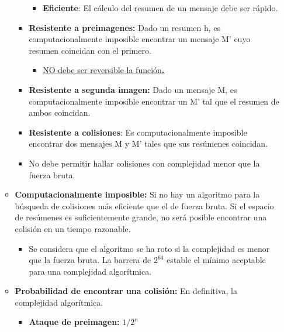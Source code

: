 \documentclass[12pt, twoside, openright]{report} %
\begin{document}
\begin{itemize}
\begin{itemize}
\begin{itemize}
\begin{itemize}
        \item \textbf{Eficiente}: El cálculo del resumen de un mensaje debe
          ser rápido.
          
        \end{itemize}
      \item \textbf{Resistente a preimagenes:} Dado un resumen h, es
        computacionalmente imposible encontrar un mensaje M' cuyo
        resumen coincidan con el primero.
        

        \begin{itemize}
        \item \underline{NO debe ser reversible la función\textbf{.}}
          
        \end{itemize}
      \item \textbf{Resistente a segunda imagen:} Dado un mensaje M, es
        computacionalmente imposible encontrar un M' tal que el resumen
        de ambos coincidan.
        
      \item \textbf{Resistente a colisiones}: Es computacionalmente
        imposible encontrar dos mensajes M y M' tales que sus resúmenes
        coincidan.
        
      \item No debe permitir hallar colisiones con complejidad menor que la
        fuerza bruta.
        
      \end{itemize}
    \item \textbf{Computacionalmente imposible:} Si no hay un algoritmo para
      la búsqueda de colisiones más eficiente que el de fuerza bruta. Si
      el espacio de resúmenes es suficientemente grande, no será posible
      encontrar una colisión en un tiempo razonable.
      

      \begin{itemize}
      \item Se considera que el algoritmo se ha roto si la complejidad es
        menor que la fuerza bruta. La barrera de $2^{64}$ estable el mínimo
        aceptable para una complejidad algorítmica.
        
      \end{itemize}
    \item \textbf{Probabilidad de encontrar una colisión:} En definitiva, la
      complejidad algorítmica.
      

      \begin{itemize}
      \item \textbf{Ataque de preimagen:} $1/2^n$
        

\end{itemize}
\end{itemize}
\end{itemize}
\end{document}
